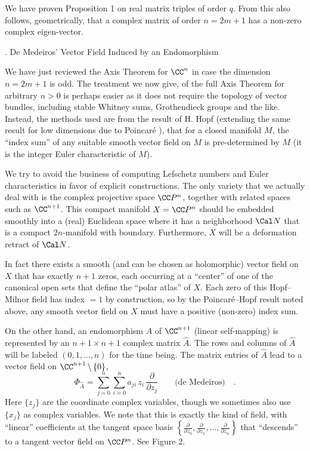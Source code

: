 We have proven Proposition 1 on real matrix triples of order $q$. From this also follows, geometrically, that a complex matrix of order $n = 2m+1$ has a non-zero complex eigen-vector.

. De Medeiros' Vector Field Induced by an Endomorphism\endhead

We have just reviewed the Axis Theorem for $\CC^n$ in case the dimension $n = 2m+1$ is odd. The treatment we now give, of the full Axis Theorem for arbitrary $n > 0$ is perhaps easier as it does not require the topology of vector bundles, including stable Whitney sums, Grothendieck groups and the like. Instead, the methods used are from the result of H. Hopf (extending the same result for low dimensions due to Poincar\'e ), that for a closed manifold $M$, the ``index sum'' of any suitable smooth vector field on $M$ is pre-determined by $M$ (it is the integer Euler characteristic of $M$).

We try to avoid the business of computing Lefschetz numbers and Euler characteristics in favor of explicit constructions. The only variety that we actually deal with is the complex projective space $\CC P^n$, together with related spaces such as $\CC^{n+1}$.
This compact manifold $X = \CC P^n$ should be embedded smoothly into a (real) Euclidean space where it has a neighborhood $\Cal N$ that is a compact $2n$-manifold with boundary. Furthermore, $X$ will be a deformation retract of $\Cal N$.

In fact there exists a smooth (and can be chosen as holomorphic) vector field on $X$ that has exactly $n+1$ zeros, each occurring at a ``center'' of one of the canonical open sets that define the ``polar atlas'' of $X$. Each zero of this Hopf--Milnor field has index $ = 1$ by construction, so by the Poincar\'e--Hopf result noted above, any smooth vector field on $X$ must have a positive (non-zero) index sum.

On the other hand, an endomorphism $A$ of $\CC^{n+1}$ (linear self-mapping) is represented by an $n+1 \times n+1$ complex matrix $\hat{A}$. The rows and columns of $\hat{A}$ will be labeled $(0, 1, \dotsc, n)$ for the time being. The
matrix entries of $\hat{A}$ lead to a vector field on $\CC^{n+1}\, \backslash \,\{0\}$,
$$\Phi_{\hat{A}} = \sum_{j=0}^n\sum_{i=0}^n a_{ji} \,z_i \,\frac{\partial }{\partial z_j} \qquad  \mbox{(de Medeiros)}\quad .
$$
Here $\{z_j\}$ are the coordinate complex variables, though we sometimes also use $\{x_j\}$ as complex variables.  We note that this is exactly the kind of field, with ``linear'' coefficients at the tangent space basis $\left\{\frac{\partial}{\partial z_0}, \frac{\partial}{\partial z_1},\dotsc, \frac{\partial}{\partial z_n}\right\}$ that ``descends'' to a tangent vector field on $\CC P^n$. See Figure 2.

